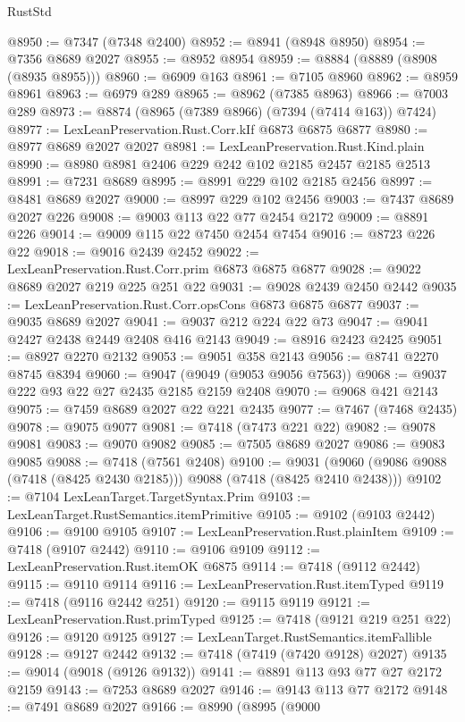 \begin{lexlean}{RustStd}
\begin{coremodule}
@8950 := @7347 (@7348 @2400)
@8952 := @8941 (@8948 @8950)
@8954 := @7356 @8689 @2027
@8955 := @8952 @8954
@8959 := @8884 (@8889 (@8908 (@8935 @8955)))
@8960 := @6909 @163
@8961 := @7105 @8960
@8962 := @8959 @8961
@8963 := @6979 @289
@8965 := @8962 (@7385 @8963)
@8966 := @7003 @289
@8973 := @8874 (@8965 (@7389 @8966) (@7394 (@7414 @163)) @7424)
@8977 := LexLeanPreservation.Rust.Corr.kIf @6873 @6875 @6877
@8980 := @8977 @8689 @2027 @2027
@8981 := LexLeanPreservation.Rust.Kind.plain
@8990 := @8980 @8981 @2406 @229 @242 @102 @2185 @2457 @2185 @2513
@8991 := @7231 @8689
@8995 := @8991 @229 @102 @2185 @2456
@8997 := @8481 @8689 @2027
@9000 := @8997 @229 @102 @2456
@9003 := @7437 @8689 @2027 @226
@9008 := @9003 @113 @22 @77 @2454 @2172
@9009 := @8891 @226
@9014 := @9009 @115 @22 @7450 @2454 @7454
@9016 := @8723 @226 @22
@9018 := @9016 @2439 @2452
@9022 := LexLeanPreservation.Rust.Corr.prim @6873 @6875 @6877
@9028 := @9022 @8689 @2027 @219 @225 @251 @22
@9031 := @9028 @2439 @2450 @2442
@9035 := LexLeanPreservation.Rust.Corr.opsCons @6873 @6875 @6877
@9037 := @9035 @8689 @2027
@9041 := @9037 @212 @224 @22 @73
@9047 := @9041 @2427 @2438 @2449 @2408 @416 @2143
@9049 := @8916 @2423 @2425
@9051 := @8927 @2270 @2132
@9053 := @9051 @358 @2143
@9056 := @8741 @2270 @8745 @8394
@9060 := @9047 (@9049 (@9053 @9056 @7563))
@9068 := @9037 @222 @93 @22 @27 @2435 @2185 @2159 @2408
@9070 := @9068 @421 @2143
@9075 := @7459 @8689 @2027 @22 @221 @2435
@9077 := @7467 (@7468 @2435)
@9078 := @9075 @9077
@9081 := @7418 (@7473 @221 @22)
@9082 := @9078 @9081
@9083 := @9070 @9082
@9085 := @7505 @8689 @2027
@9086 := @9083 @9085
@9088 := @7418 (@7561 @2408)
@9100 := @9031 (@9060 (@9086 @9088 (@7418 (@8425 @2430 @2185))) @9088 (@7418 (@8425 @2410 @2438)))
@9102 := @7104 LexLeanTarget.TargetSyntax.Prim
@9103 := LexLeanTarget.RustSemantics.itemPrimitive
@9105 := @9102 (@9103 @2442)
@9106 := @9100 @9105
@9107 := LexLeanPreservation.Rust.plainItem
@9109 := @7418 (@9107 @2442)
@9110 := @9106 @9109
@9112 := LexLeanPreservation.Rust.itemOK @6875
@9114 := @7418 (@9112 @2442)
@9115 := @9110 @9114
@9116 := LexLeanPreservation.Rust.itemTyped
@9119 := @7418 (@9116 @2442 @251)
@9120 := @9115 @9119
@9121 := LexLeanPreservation.Rust.primTyped
@9125 := @7418 (@9121 @219 @251 @22)
@9126 := @9120 @9125
@9127 := LexLeanTarget.RustSemantics.itemFallible
@9128 := @9127 @2442
@9132 := @7418 (@7419 (@7420 @9128) @2027)
@9135 := @9014 (@9018 (@9126 @9132))
@9141 := @8891 @113 @93 @77 @27 @2172 @2159
@9143 := @7253 @8689 @2027
@9146 := @9143 @113 @77 @2172
@9148 := @7491 @8689 @2027
@9166 := @8990
    (@8995
      (@9000

\end{coremodule}
\end{lexlean}
